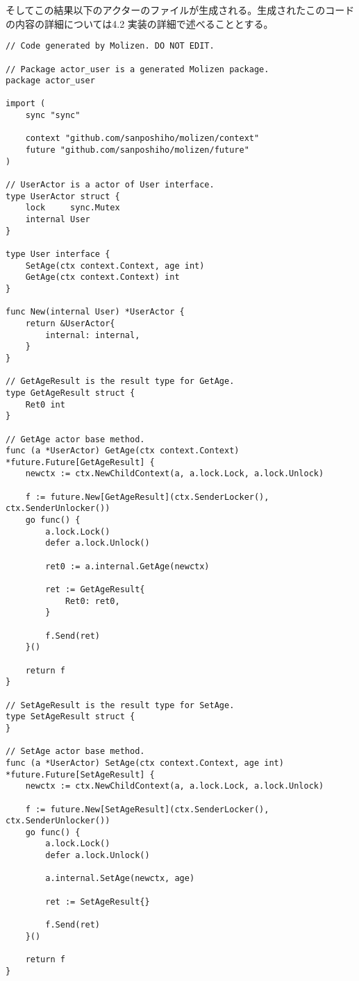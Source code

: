そしてこの結果以下のアクターのファイルが生成される。生成されたこのコードの内容の詳細については4.2
実装の詳細で述べることとする。

\begin{verbatim}
// Code generated by Molizen. DO NOT EDIT.

// Package actor_user is a generated Molizen package.
package actor_user

import (
    sync "sync"

    context "github.com/sanposhiho/molizen/context"
    future "github.com/sanposhiho/molizen/future"
)

// UserActor is a actor of User interface.
type UserActor struct {
    lock     sync.Mutex
    internal User
}

type User interface {
    SetAge(ctx context.Context, age int)
    GetAge(ctx context.Context) int
}

func New(internal User) *UserActor {
    return &UserActor{
        internal: internal,
    }
}

// GetAgeResult is the result type for GetAge.
type GetAgeResult struct {
    Ret0 int
}

// GetAge actor base method.
func (a *UserActor) GetAge(ctx context.Context) *future.Future[GetAgeResult] {
    newctx := ctx.NewChildContext(a, a.lock.Lock, a.lock.Unlock)

    f := future.New[GetAgeResult](ctx.SenderLocker(), ctx.SenderUnlocker())
    go func() {
        a.lock.Lock()
        defer a.lock.Unlock()

        ret0 := a.internal.GetAge(newctx)

        ret := GetAgeResult{
            Ret0: ret0,
        }

        f.Send(ret)
    }()

    return f
}

// SetAgeResult is the result type for SetAge.
type SetAgeResult struct {
}

// SetAge actor base method.
func (a *UserActor) SetAge(ctx context.Context, age int) *future.Future[SetAgeResult] {
    newctx := ctx.NewChildContext(a, a.lock.Lock, a.lock.Unlock)

    f := future.New[SetAgeResult](ctx.SenderLocker(), ctx.SenderUnlocker())
    go func() {
        a.lock.Lock()
        defer a.lock.Unlock()

        a.internal.SetAge(newctx, age)

        ret := SetAgeResult{}

        f.Send(ret)
    }()

    return f
}
\end{verbatim}

